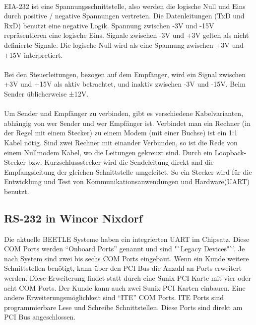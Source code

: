 \paragraph{}
EIA-232 ist eine Spannungsschnittstelle, also werden die logische Null und Eins durch positive / negative Spannungen vertreten. Die Datenleitungen (TxD und RxD) benutzt eine negative Logik. Spannung zwischen -3V und -15V repräsentieren eine logische Eins. Signale zwischen -3V und +3V gelten als nicht definierte Signale. Die logische Null wird als eine Spannung zwischen +3V und +15V interpretiert. 
 
\paragraph{}
Bei den Steuerleitungen, bezogen auf dem Empfänger, wird ein Signal zwischen +3V und +15V als aktiv betrachtet, und inaktiv zwischen -3V und -15V. Beim Sender üblicherweise ±12V.

\paragraph{}
Um Sender und Empfänger zu verbinden, gibt es verschiedene Kabelvarianten, abhängig von wer Sender und wer Empfänger ist. Verbindet man ein Rechner (in der Regel mit einem Stecker) zu einem Modem (mit einer Buchse) ist ein 1:1 Kabel nötig. Sind zwei Rechner mit einander Verbunden, so ist die Rede von einem Nullmodem Kabel, wo die Leitungen gekreuzt sind. Durch ein Loopback-Stecker bzw. Kurzschlussstecker wird die Sendeleitung direkt and die Empfangsleitung der gleichen Schnittstelle umgeleitet. So ein Stecker wird für die Entwicklung und Test von Kommunikationsanwendungen und Hardware(UART) benutzt.


\subsection{RS-232 in Wincor Nixdorf}
Die aktuelle BEETLE Systeme haben ein integrierten UART im Chipsatz. Diese COM Ports werden "`Onboard Ports"' genannt und sind "`Legacy Devices"`'. Je nach System sind zwei bis sechs COM Ports eingebaut. Wenn ein Kunde weitere Schnittstellen benötigt, kann über den PCI Bus die Anzahl an Ports erweitert werden. Diese Erweiterung findet statt durch eine Sunix PCI Karte mit vier oder acht COM Ports. Der Kunde kann auch zwei Sunix PCI Karten einbauen. Eine andere Erweiterungsmöglichkeit sind "`ITE"' COM Ports. ITE Ports sind programmierbare Lese und Schreibe Schnittstellen. Diese Ports sind direkt am PCI Bus angeschlossen.

